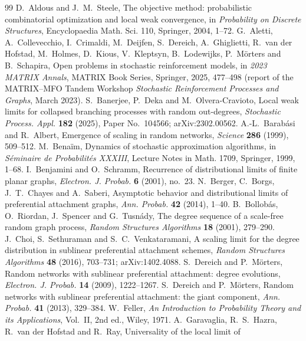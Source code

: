 \documentclass[11pt]{amsart}
\theoremstyle{definition}
\begin{document}
\begin{thebibliography}{99}
 D.~Aldous and J.~M.~Steele, The objective method: probabilistic combinatorial optimization and local
weak convergence, in \emph{Probability on Discrete Structures}, Encyclopaedia Math. Sci. 110, Springer, 2004, 1--72.
 G.~Aletti, A.~Collevecchio, I.~Crimaldi, M.~Deijfen, S.~Dereich, A.~Ghiglietti, R.~van der Hofstad,
M.~Holmes, D.~Kious, V.~Kleptsyn, B.~Lodewijks, P.~M\"orters and B.~Schapira, Open problems in stochastic
reinforcement models, in \emph{2023 MATRIX Annals}, MATRIX Book Series, Springer, 2025, 477--498 (report of the
MATRIX--MFO Tandem Workshop \emph{Stochastic Reinforcement Processes and Graphs}, March 2023).
 S.~Banerjee, P.~Deka and M.~Olvera-Cravioto, Local weak limits for collapsed branching processes with
random out-degrees, \emph{Stochastic Process. Appl.} \textbf{182} (2025), Paper No.~104566; arXiv:2302.00562.
 A.-L.~Barab\'asi and R.~Albert, Emergence of scaling in random networks, \emph{Science} \textbf{286}
(1999), 509--512.
 M.~Bena\"im, Dynamics of stochastic approximation algorithms, in \emph{S\'eminaire de
Probabilit\'es XXXIII}, Lecture Notes in Math. 1709, Springer, 1999, 1--68.
 I.~Benjamini and O.~Schramm, Recurrence of distributional limits of finite planar graphs,
\emph{Electron. J. Probab.} \textbf{6} (2001), no.~23.
 N.~Berger, C.~Borgs, J.~T.~Chayes and A.~Saberi, Asymptotic behavior and distributional limits of
preferential attachment graphs, \emph{Ann. Probab.} \textbf{42} (2014), 1--40.
 B.~Bollob\'as, O.~Riordan, J.~Spencer and G.~Tusn\'ady, The degree sequence of a scale-free random
graph process, \emph{Random Structures Algorithms} \textbf{18} (2001), 279--290.
 J.~Choi, S.~Sethuraman and S.~C.~Venkataramani, A scaling limit for the degree distribution in
sublinear preferential attachment schemes, \emph{Random Structures Algorithms} \textbf{48} (2016), 703--731;
arXiv:1402.4088.
 S.~Dereich and P.~M\"orters, Random networks with sublinear preferential attachment: degree
evolutions, \emph{Electron. J. Probab.} \textbf{14} (2009), 1222--1267.
 S.~Dereich and P.~M\"orters, Random networks with sublinear preferential attachment: the giant
component, \emph{Ann. Probab.} \textbf{41} (2013), 329--384.
 W.~Feller, \emph{An Introduction to Probability Theory and its Applications}, Vol.~II, 2nd ed.,
Wiley, 1971.
 A.~Garavaglia, R.~S.~Hazra, R.~van der Hofstad and R.~Ray, Universality of the local limit of

\end{thebibliography}
\end{document}
